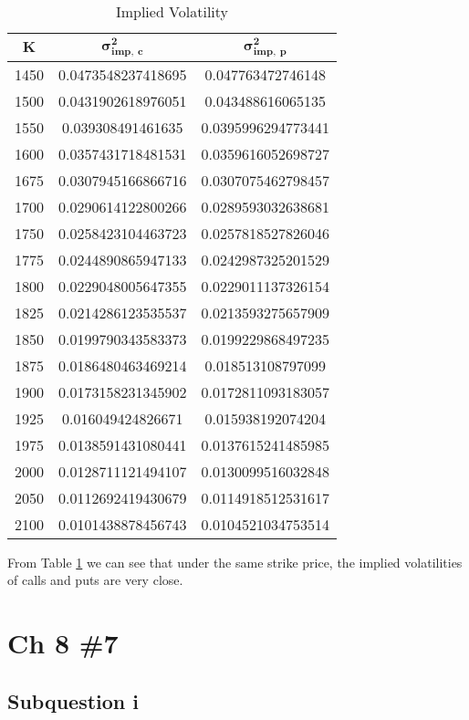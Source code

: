 \documentclass{article}
\DeclareMathOperator{\1}{\mathit{1}}
\numberwithin{figure}{section} %
\numberwithin{table}{section}
\begin{document}
	\begin{table}[hbtp]
	\centering
    \caption{\label{tab:impVol}%
    Implied Volatility}
    \small
    \begin{tabular}{ccc}
    \hline\hline
    $\mathbf{K}$ & $\mathbf{\sigma^2_{imp,~c}}$ & $\mathbf{\sigma^2_{imp,~p}}$\\ 
    \hline
1450 & 0.0473548237418695 & 0.047763472746148\\
1500 & 0.0431902618976051 & 0.043488616065135\\
1550 & 0.039308491461635 & 0.0395996294773441\\
1600 & 0.0357431718481531 & 0.0359616052698727\\
1675 & 0.0307945166866716 & 0.0307075462798457\\
1700 & 0.0290614122800266 & 0.0289593032638681\\
1750 & 0.0258423104463723 & 0.0257818527826046\\
1775 & 0.0244890865947133 & 0.0242987325201529\\
1800 & 0.0229048005647355 & 0.0229011137326154\\
1825 & 0.0214286123535537 & 0.0213593275657909\\
1850 & 0.0199790343583373 & 0.0199229868497235\\
1875 & 0.0186480463469214 & 0.018513108797099\\
1900 & 0.0173158231345902 & 0.0172811093183057\\
1925 & 0.016049424826671 & 0.015938192074204\\
1975 & 0.0138591431080441 & 0.0137615241485985\\
2000 & 0.0128711121494107 & 0.0130099516032848\\
2050 & 0.0112692419430679 & 0.0114918512531617\\
2100 & 0.0101438878456743 & 0.0104521034753514\\
    \hline\hline
    \end{tabular}
    \end{table}

From Table \ref{tab:impVol} we can see that under the same strike price, the implied volatilities of calls and puts are very close.

\section{Ch 8 \#7}
\subsection{Subquestion i}
\end{document}
